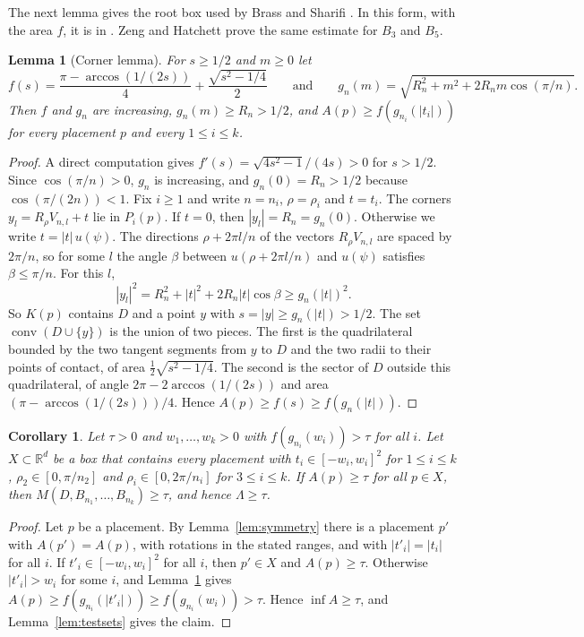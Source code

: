 \documentclass[11pt]{amsart}
\newtheorem{lemma}[theorem]{Lemma}
\newtheorem{corollary}[theorem]{Corollary}
\theoremstyle{definition}
\theoremstyle{remark}
\numberwithin{equation}{section}
\newcommand{\R}{\mathbb{R}}
\newcommand{\conv}{\operatorname{conv}}
\begin{document}
The next lemma gives the root box used by Brass and Sharifi \cite{BS05}. In this form, with the area $f$, it is in \cite[Lemma~4.4 and Remark~4.6]{Mis26}. Zeng \cite[Sections~S10.2 and~S10.3]{Zen26} and Hatchett \cite{Hat26} prove the same estimate for $B_3$ and $B_5$.

\begin{lemma}[Corner lemma]\label{lem:corner}
For $s\ge1/2$ and $m\ge0$ let
\[
f(s)=\frac{\pi-\arccos(1/(2s))}{4}+\frac{\sqrt{s^2-1/4}}{2}\qquad\text{and}\qquad g_n(m)=\sqrt{R_n^2+m^2+2R_nm\cos(\pi/n)}.
\]
Then $f$ and $g_n$ are increasing, $g_n(m)\ge R_n>1/2$, and $A(p)\ge f(g_{n_i}(|t_i|))$ for every placement $p$ and every $1\le i\le k$.
\end{lemma}

\begin{proof}
A direct computation gives $f'(s)=\sqrt{4s^2-1}/(4s)>0$ for $s>1/2$. Since $\cos(\pi/n)>0$, $g_n$ is increasing, and $g_n(0)=R_n>1/2$ because $\cos(\pi/(2n))<1$. Fix $i\ge1$ and write $n=n_i$, $\rho=\rho_i$ and $t=t_i$. The corners $y_l=R_\rho V_{n,l}+t$ lie in $P_i(p)$. If $t=0$, then $|y_l|=R_n=g_n(0)$. Otherwise we write $t=|t|\,u(\psi)$. The directions $\rho+2\pi l/n$ of the vectors $R_\rho V_{n,l}$ are spaced by $2\pi/n$, so for some $l$ the angle $\beta$ between $u(\rho+2\pi l/n)$ and $u(\psi)$ satisfies $\beta\le\pi/n$. For this $l$,
\[
|y_l|^2=R_n^2+|t|^2+2R_n|t|\cos\beta\ge g_n(|t|)^2.
\]
So $K(p)$ contains $D$ and a point $y$ with $s=|y|\ge g_n(|t|)>1/2$. The set $\conv(D\cup\{y\})$ is the union of two pieces. The first is the quadrilateral bounded by the two tangent segments from $y$ to $D$ and the two radii to their points of contact, of area $\frac12\sqrt{s^2-1/4}$. The second is the sector of $D$ outside this quadrilateral, of angle $2\pi-2\arccos(1/(2s))$ and area $(\pi-\arccos(1/(2s)))/4$. Hence $A(p)\ge f(s)\ge f(g_n(|t|))$.
\end{proof}

\begin{corollary}\label{cor:root}
Let $\tau>0$ and $w_1,\dots,w_k>0$ with $f(g_{n_i}(w_i))>\tau$ for all $i$. Let $X\subset\R^d$ be a box that contains every placement with $t_i\in[-w_i,w_i]^2$ for $1\le i\le k$, $\rho_2\in[0,\pi/n_2]$ and $\rho_i\in[0,2\pi/n_i]$ for $3\le i\le k$. If $A(p)\ge\tau$ for all $p\in X$, then $M(D,B_{n_1},\dots,B_{n_k})\ge\tau$, and hence $\Lambda\ge\tau$.
\end{corollary}

\begin{proof}
Let $p$ be a placement. By Lemma~\ref{lem:symmetry} there is a placement $p'$ with $A(p')=A(p)$, with rotations in the stated ranges, and with $|t'_i|=|t_i|$ for all $i$. If $t'_i\in[-w_i,w_i]^2$ for all $i$, then $p'\in X$ and $A(p)\ge\tau$. Otherwise $|t'_i|>w_i$ for some $i$, and Lemma~\ref{lem:corner} gives $A(p)\ge f(g_{n_i}(|t'_i|))\ge f(g_{n_i}(w_i))>\tau$. Hence $\inf A\ge\tau$, and Lemma~\ref{lem:testsets} gives the claim.
\end{proof}
\end{document}
